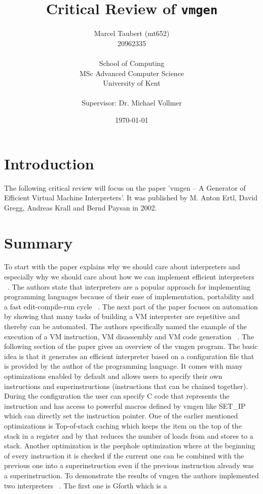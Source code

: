 \documentclass{article}
\title{Critical Review of \texttt{vmgen}}
\author{
    Marcel Taubert  (mt652)\\
    20962335        \\
    \\
    School of Computing \\
    MSc Advanced Computer Science\\
    University of Kent \\
    \\
    Supervisor: Dr. Michael Vollmer
}
\date{\today}
\begin{document}
\maketitle
\clearpage

\section*{Introduction}
The following critical review will focus on the paper 'vmgen -- A Generator of
Efficient Virtual Machine Interpreters'. It was published by M. Anton Ertl,
David Gregg, Andreas Krall and Bernd Paysan in 2002.  

\section{Summary} To start with the paper explains why we should care about
interpreters and especially why we should care about how we can implement
efficient interpreters ~\cite{vmgen}. The authors state that interpreters are a popular
approach for implementing programming languages because of their ease of
implementation, portability and a fast edit-compile-run cycle ~\cite{vmgen}.
The next part of the paper focuses on automation by showing that many tasks of
building a VM interpreter are repetitive and thereby can be automated. The
authors specifically named the example of the execution of a VM instruction, VM
disassembly and VM code generation ~\cite{vmgen}. The following section of the
paper gives an overview of the vmgen program. The basic idea is that it
generates an efficient interpreter based on a configuration file that is
provided by the author of the programming language. It comes with many
optimizations enabled by default and allows users to specify their own
instructions and superinstructions (instructions that can be chained together).
During the configuration the user can specify C code that represents the
instruction and has access to powerful macros defined by vmgen like SET\_IP
which can directly set the instruction pointer. One of the earlier mentioned
optimizations is Top-of-stack caching which keeps the item on the top of the
stack in a register and by that reduces the number of loads from and stores to
a stack. Another optimization is the peephole optimization where at the
beginning of every instruction it is checked if the current one can be combined
with the previous one into a superinstruction even if the previous instruction
already was a superinstruction. To demonstrate the results of vmgen the authors
implemented two interpreters ~\cite{vmgen}. The first one is Gforth which is a
\end{document}
